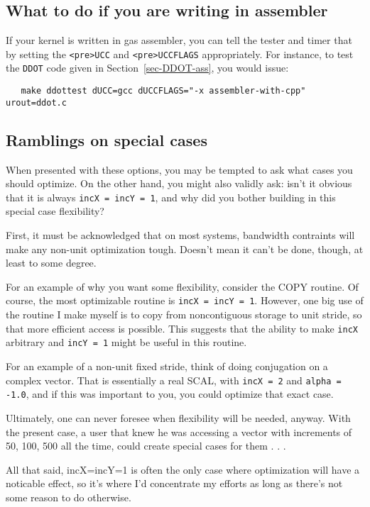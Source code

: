 \documentclass[11pt]{article}
\begin{document}
\subsection{What to do if you are writing in assembler}
If your kernel is written in gas assembler, you can tell the tester
and timer that by setting the \verb+<pre>UCC+ and \verb+<pre>UCCFLAGS+ 
appropriately.
For instance, to test the {\tt DDOT} code given in Section~\ref{sec-DDOT-ass},
you would issue:
\begin{verbatim}
   make ddottest dUCC=gcc dUCCFLAGS="-x assembler-with-cpp" urout=ddot.c
\end{verbatim}

\subsection{Ramblings on special cases}

When presented with these options, you may be tempted to ask what cases
you should optimize.  On the other hand, you might also validly ask: 
isn't it obvious that it is always {\tt incX = incY = 1}, and why did
you bother building in this special case flexibility?

First, it must be acknowledged that on most systems, bandwidth contraints
will make any non-unit optimization tough.  Doesn't mean it can't be done,
though, at least to some degree.

For an example of why you want some flexibility, consider the COPY routine.
Of course, the most optimizable routine is {\tt incX = incY = 1}.  However,
one big use of the routine I make myself is to copy from noncontiguous
storage to unit stride, so that more efficient access is possible.  This
suggests that the ability to make {\tt incX} arbitrary and {\tt incY = 1}
might be useful in this routine.

For an example of a non-unit fixed stride, think of doing conjugation on
a complex vector.  That is essentially a real SCAL, with {\tt incX = 2} and
{\tt alpha = -1.0}, and if this was important to you, you could optimize that
exact case.

Ultimately, one can never foresee when flexibility will be needed, anyway.
With the present case, a user that knew he was accessing a vector with
increments of 50, 100, 500 all the time, could create special cases for
them . . .

All that said, {incX=incY=1} is often the only case where optimization will
have a noticable effect, so it's where I'd concentrate my efforts as long
as there's not some reason to do otherwise.
\end{document}
